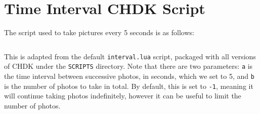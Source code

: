 \section{Time Interval CHDK Script}
\label{app:interval}

The script used to take pictures every 5 seconds is as follows:

\inputminted{lua}{code/number-interval.lua}

This is adapted from the default \texttt{interval.lua} script, packaged with all
versions of CHDK under the \texttt{SCRIPTS} directory. Note that there are two
parameters: \texttt{a} is the time interval between successive photos, in
seconds, which we set to 5, and \texttt{b} is the number of photos to take in
total. By default, this is set to \texttt{-1}, meaning it will continue taking
photos indefinitely, however it can be useful to limit the number of photos.
